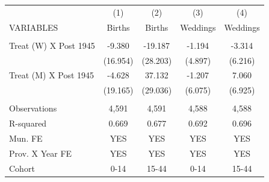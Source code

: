 \begin{tabular}{lcccc} \hline
 & (1) & (2) & (3) & (4) \\
VARIABLES & Births & Births & Weddings & Weddings \\ \hline
 &  &  &  &  \\
Treat (W) X Post 1945 & -9.380 & -19.187 & -1.194 & -3.314 \\
 & (16.954) & (28.203) & (4.897) & (6.216) \\
Treat (M) X Post 1945 & -4.628 & 37.132 & -1.207 & 7.060 \\
 & (19.165) & (29.036) & (6.075) & (6.925) \\
 &  &  &  &  \\
Observations & 4,591 & 4,591 & 4,588 & 4,588 \\
R-squared & 0.669 & 0.677 & 0.692 & 0.696 \\
Mun. FE & YES & YES & YES & YES \\
Prov. X Year FE & YES & YES & YES & YES \\
 Cohort & 0-14 & 15-44 & 0-14 & 15-44 \\ \hline
\end{tabular}
